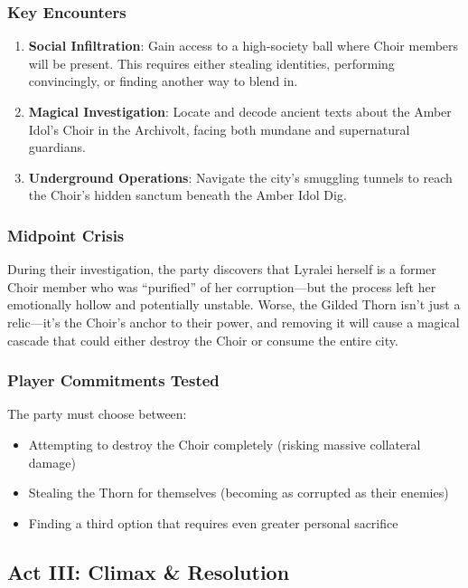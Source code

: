 \documentclass[11pt]{article}
\begin{document}
\subsubsection*{Key Encounters}

\begin{enumerate}
  \item \textbf{Social Infiltration}: Gain access to a high-society ball where Choir members will be present. This requires either stealing identities, performing convincingly, or finding another way to blend in.
  \item \textbf{Magical Investigation}: Locate and decode ancient texts about the Amber Idol's Choir in the Archivolt, facing both mundane and supernatural guardians.
  \item \textbf{Underground Operations}: Navigate the city's smuggling tunnels to reach the Choir's hidden sanctum beneath the Amber Idol Dig.
\end{enumerate}

\subsubsection*{Midpoint Crisis}

During their investigation, the party discovers that Lyralei herself is a former Choir member who was ``purified'' of her corruption---but the process left her emotionally hollow and potentially unstable. Worse, the Gilded Thorn isn't just a relic---it's the Choir's anchor to their power, and removing it will cause a magical cascade that could either destroy the Choir or consume the entire city.

\subsubsection*{Player Commitments Tested}

The party must choose between:
\begin{itemize}
  \item Attempting to destroy the Choir completely (risking massive collateral damage)
  \item Stealing the Thorn for themselves (becoming as corrupted as their enemies)
  \item Finding a third option that requires even greater personal sacrifice
\end{itemize}

\subsection*{Act III: Climax \& Resolution}
\end{document}
